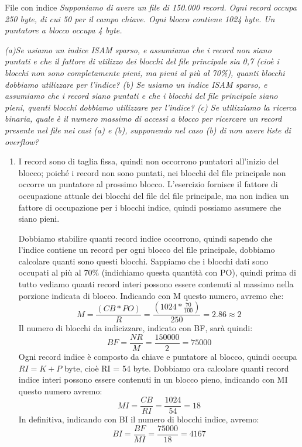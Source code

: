 \begin{Example}{File con indice}{}
    \textit{Supponiamo di avere un file di 150.000 record. Ogni record occupa 250 byte, di cui 50 per il campo chiave. Ogni blocco contiene 1024 byte. Un puntatore a blocco occupa 4 byte.}

    \textit{(a)Se usiamo un indice ISAM sparso, e assumiamo che i record non siano puntati e che il fattore di utilizzo dei blocchi del file principale sia 0,7 (cioè i blocchi non sono completamente pieni, ma pieni al più al 70\%), quanti blocchi dobbiamo utilizzare per l'indice? (b) Se usiamo un indice ISAM sparso, e assumiamo che i record siano puntati e che i blocchi del file principale siano pieni, quanti blocchi dobbiamo utilizzare per l'indice? (c) Se utilizziamo la ricerca binaria, quale è il numero massimo di accessi a blocco per ricercare un record presente nel file nei casi (a) e (b), supponendo nel caso (b) di non avere liste di overflow?}

    \begin{enumerate}[label=(\alph*)]
        \item I record sono di taglia fissa, quindi non occorrono puntatori all'inizio del blocco; poiché i record non sono puntati, nei blocchi del file principale non occorre un puntatore al prossimo blocco. L'esercizio fornisce il fattore di occupazione attuale dei blocchi del file del file principale, ma non indica un fattore di occupazione per i blocchi indice, quindi possiamo assumere che siano pieni.

        Dobbiamo stabilire quanti record indice occorrono, quindi sapendo che l'indice contiene un record per ogni blocco del file principale, dobbiamo calcolare quanti sono questi blocchi. Sappiamo che i blocchi dati sono occupati al più al 70\% (indichiamo questa quantità con PO), quindi prima di tutto vediamo quanti record interi possono essere contenuti al massimo nella porzione indicata di blocco. Indicando con M questo numero, avremo che:
        \begin{equation*}
            M=\frac{(CB*PO)}{R}=\frac{(1024*\frac{70}{100})}{250}=2.86\approx 2
        \end{equation*}
        Il numero di blocchi da indicizzare, indicato con BF, sarà quindi:
        \begin{equation*}
            BF=\frac{NR}{M}=\frac{150000}{2}=75000
        \end{equation*}
        Ogni record indice è composto da chiave e puntatore al blocco, quindi occupa $RI = K + P$ byte, cioè RI = 54 byte. Dobbiamo ora calcolare quanti record indice interi possono essere contenuti in un blocco pieno, indicando con MI questo numero avremo:
        \begin{equation*}
            MI=\frac{CB}{RI}=\frac{1024}{54}=18
        \end{equation*}
        In definitiva, indicando con BI il numero di blocchi indice, avremo:
        \begin{equation*}
            BI=\frac{BF}{MI}=\frac{75000}{18}=4167
        \end{equation*}


\end{enumerate}
\end{Example}
